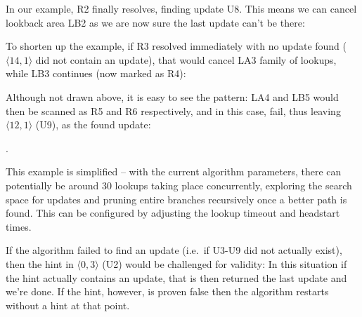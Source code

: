 In our example, R2 finally resolves, finding update U8. This means we can cancel lookback area LB2 as we are now sure the last update can't be there:


To shorten up the example, if R3 resolved immediately with no update found ($\langle  14, 1 \rangle$ did not contain an update), that would cancel LA3 family of lookups, while LB3 continues (now marked as R4):


Although not drawn above, it is easy to see the pattern: LA4 and LB5 would then be scanned as R5 and R6 respectively, and in this case, fail, thus leaving $\langle  12, 1 \rangle$ (U9), as the found update:


.

This example is simplified -- with the current algorithm parameters, there can potentially be around 30 lookups taking place concurrently, exploring the search space for updates and pruning entire branches recursively once a better path is found. This can be configured by adjusting the lookup timeout and headstart times.

If the algorithm failed to find an update (i.e.\ if U3-U9 did not actually exist), then the hint in $\langle  0, 3 \rangle$ (U2) would be challenged for validity: In this situation if the hint actually contains an update, that is then returned the last update and we're done. If the hint, however, is proven false then the algorithm restarts without a hint at that point.


% 


